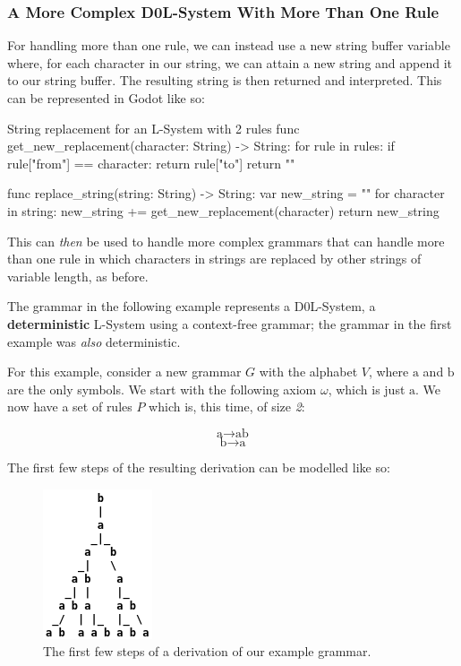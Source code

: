 \subsubsection{A More Complex D0L-System With More Than One Rule}

For handling more than one rule, we can instead use a new string buffer variable where, for each character in our string, we can attain a new string and append it to our string buffer. The resulting string is then returned and interpreted. This can be represented in Godot like so:

\begin{codeblock}{String replacement for an L-System with 2 rules}
func get_new_replacement(character: String) -> String:
	for rule in rules:
		if rule["from"] == character:
			return rule["to"]
	return ""

func replace_string(string: String) -> String:
	var new_string = ""
	for character in string:
		new_string += get_new_replacement(character)
	return new_string
\end{codeblock}

This can \textit{then} be used to handle more complex grammars that can handle more than one rule in which characters in strings are replaced by other strings of variable length, as before.

The grammar in the following example represents a D0L-System\cite{lsystemintro}, a \textbf{deterministic} L-System using a context-free grammar; the grammar in the first example was \textit{also} deterministic.

\newcommand{\A}{\mbox{a}}
\newcommand{\B}{\mbox{b}}

For this example, consider a new grammar $G$ with the alphabet $V$, where $\A$ and $\B$ are the only symbols. We start with the following axiom $\omega$, which is just $\A$. We now have a set of rules $P$ which is, this time, of size \textit{2}:

$$ \A \rightarrow \A\B $$
$$ \B \rightarrow \A $$

The first few steps of the resulting derivation can be modelled like so:

\begin{figure}[H]
    \centering
    \includegraphics[scale=0.5]{Images/derivationtree.png}
    \caption{The first few steps of a derivation of our example grammar.\cite{lsystemintro}}
    \label{fig:derivationtree}
\end{figure}

